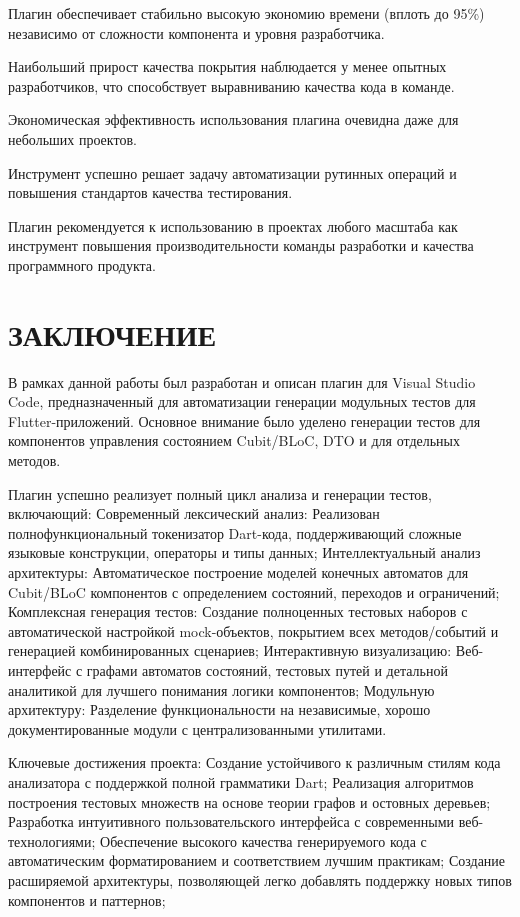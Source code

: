 \documentclass[14pt, russian]{scrartcl}
\newcommand{\anonsection}[1]{\cleardoublepage
\phantomsection
\addcontentsline{toc}{section}{\protect\numberline{}#1}
\section*{#1}\vspace*{2.5ex} %
}
\begin{document}
\begin{enumerate*}
    \item Плагин обеспечивает стабильно высокую экономию времени (вплоть до 95\%) независимо от сложности компонента и уровня разработчика.
    \item Наибольший прирост качества покрытия наблюдается у менее опытных разработчиков, что способствует выравниванию качества кода в команде.
    \item Экономическая эффективность использования плагина очевидна даже для небольших проектов.
    \item Инструмент успешно решает задачу автоматизации рутинных операций и повышения стандартов качества тестирования.
\end{enumerate*}

Плагин рекомендуется к использованию в проектах любого масштаба как инструмент повышения производительности команды разработки и качества программного продукта.

\anonsection{ЗАКЛЮЧЕНИЕ}
В рамках данной работы был разработан и описан плагин для Visual Studio Code, предназначенный для автоматизации генерации модульных тестов для Flutter-приложений. Основное внимание было уделено генерации тестов для компонентов управления состоянием Cubit/BLoC, DTO и для отдельных методов.

Плагин успешно реализует полный цикл анализа и генерации тестов, включающий:
Современный лексический анализ: Реализован полнофункциональный токенизатор Dart-кода, поддерживающий сложные языковые конструкции, операторы и типы данных;
Интеллектуальный анализ архитектуры: Автоматическое построение моделей конечных автоматов для Cubit/BLoC компонентов с определением состояний, переходов и ограничений;
Комплексная генерация тестов: Создание полноценных тестовых наборов с автоматической настройкой mock-объектов, покрытием всех методов/событий и генерацией комбинированных сценариев;
Интерактивную визуализацию: Веб-интерфейс с графами автоматов состояний, тестовых путей и детальной аналитикой для лучшего понимания логики компонентов;
Модульную архитектуру: Разделение функциональности на независимые, хорошо документированные модули с централизованными утилитами.

Ключевые достижения проекта:
Создание устойчивого к различным стилям кода анализатора с поддержкой полной грамматики Dart;
Реализация алгоритмов построения тестовых множеств на основе теории графов и остовных деревьев;
Разработка интуитивного пользовательского интерфейса с современными веб-технологиями;
Обеспечение высокого качества генерируемого кода с автоматическим форматированием и соответствием лучшим практикам;
Создание расширяемой архитектуры, позволяющей легко добавлять поддержку новых типов компонентов и паттернов;
\end{document}
